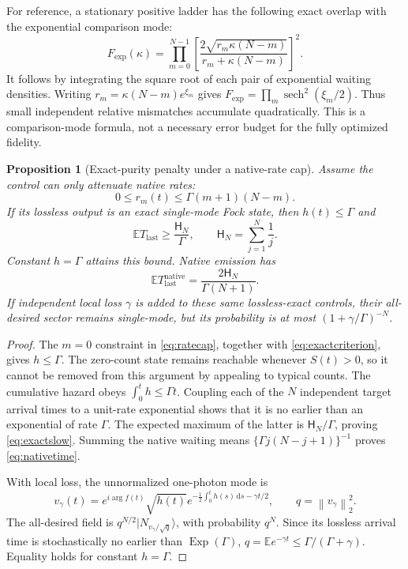 \documentclass[11pt,a4paper]{article}
\newtheorem{proposition}[theorem]{Proposition}
\newcommand{\E}{\mathbb E}
\newcommand{\HH}{\mathsf H}
\newcommand{\norm}[1]{\left\lVert#1\right\rVert}
\newcommand{\Fock}[2]{\lvert #1_{#2}\rangle}
\newcommand{\dd}{\,\mathrm d}
\newcommand{\sech}{\operatorname{sech}}
\begin{document}
For reference, a stationary positive ladder has the following
exact overlap with the exponential comparison mode:
\begin{equation}
 F_{\exp}(\kappa)=
 \prod_{m=0}^{N-1}
 \left[\frac{2\sqrt{r_m\kappa(N-m)}}{r_m+\kappa(N-m)}\right]^2.
 \label{eq:stationaryoverlap}
\end{equation}
It follows by integrating the square root of each pair of
exponential waiting densities. Writing
\(r_m=\kappa(N-m)e^{\xi_m}\) gives
\(F_{\exp}=\prod_m\sech^2(\xi_m/2)\). Thus small independent
relative mismatches accumulate quadratically. This is a
comparison-mode formula, not a necessary error budget for the
fully optimized fidelity.

\begin{proposition}[Exact-purity penalty under a native-rate cap]
Assume the control can only attenuate native rates:
\begin{equation}
 0\le r_m(t)\le\Gamma(m+1)(N-m).
 \label{eq:ratecap}
\end{equation}
If its lossless output is an exact single-mode Fock state, then
\(h(t)\le\Gamma\) and
\begin{equation}
 \E T_{\mathrm{last}}\ge\frac{\HH_N}{\Gamma},
 \qquad \HH_N=\sum_{j=1}^N\frac1j.
 \label{eq:exactslow}
\end{equation}
Constant \(h=\Gamma\) attains this bound. Native emission has
\begin{equation}
 \E T_{\mathrm{last}}^{\mathrm{native}}
 =\frac{2\HH_N}{\Gamma(N+1)}.
 \label{eq:nativetime}
\end{equation}
If independent local loss \(\gamma\) is added to these same
lossless-exact controls, their all-desired sector remains
single-mode, but its probability is at most
\((1+\gamma/\Gamma)^{-N}\).
\end{proposition}
\begin{proof}
The \(m=0\) constraint in \eqref{eq:ratecap}, together with
\eqref{eq:exactcriterion}, gives \(h\le\Gamma\).
The zero-count state remains reachable whenever \(S(t)>0\), so
it cannot be removed from this argument by appealing to typical
counts. The cumulative hazard obeys
\(\int_0^t h\le\Gamma t\). Coupling each of the \(N\) independent
target arrival times to a unit-rate exponential shows that it is
no earlier than an exponential of rate \(\Gamma\). The expected
maximum of the latter is \(\HH_N/\Gamma\), proving
\eqref{eq:exactslow}. Summing the native waiting means
\(\{\Gamma j(N-j+1)\}^{-1}\) proves \eqref{eq:nativetime}.

With local loss, the unnormalized one-photon mode is
\begin{equation}
 v_\gamma(t)=e^{i\arg f(t)}\sqrt{h(t)}
 e^{-\frac12\int_0^t h(s)\dd s-\gamma t/2},\qquad
 q=\norm{v_\gamma}_2^2.
\end{equation}
The all-desired field is
\(q^{N/2}\Fock{N}{v_\gamma/\sqrt q}\), with probability \(q^N\).
Since its lossless arrival time is stochastically no earlier than
\(\operatorname{Exp}(\Gamma)\),
\(q=\E e^{-\gamma t}\le\Gamma/(\Gamma+\gamma)\).
Equality holds for constant \(h=\Gamma\).
\end{proof}
\end{document}
